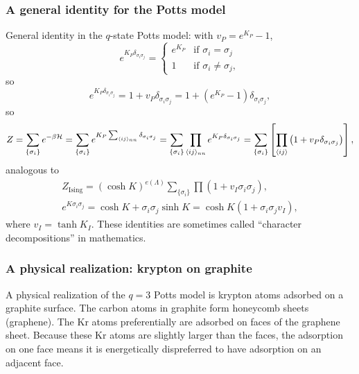 \subsubsection*{A general identity for the Potts model}

General identity in the $q$-state Potts model: with $v_P = e^{K_P}-1$,
\begin{equation}
  e^{K_P\delta_{\sigma_i\sigma_j}} = \begin{cases} e^{K_P} & \text{if } \sigma_i = \sigma_j\\ 1 & \text{if } \sigma_i\ne\sigma_j,\end{cases}
\end{equation}
so
\begin{equation}
  e^{K_P\delta_{\sigma_i\sigma_j}} = 1 + v_P\delta_{\sigma_i\sigma_j} = 1 + \left(e^{K_P}-1\right)\delta_{\sigma_i\sigma_j},
\end{equation}
so
\begin{equation}
  Z = \sum_{\{\sigma_i\}}e^{-\beta\mathcal{H}} = \sum_{\{\sigma_i\}}e^{K_P\sum_{\langle ij\rangle_{nn}}\delta_{\sigma_i\sigma_j}}
    = \sum_{\{\sigma_i\}}\prod_{\langle ij\rangle_{nn}}e^{K_P\delta_{\sigma_i\sigma_j}}
    = \sum_{\{\sigma_i\}}\left[\prod_{\langle ij\rangle}\left(1+v_P\delta_{\sigma_i\sigma_j}\right)\right],
\end{equation}
analogous to
\begin{gather}
  Z_{\text{Ising}} = (\cosh K)^{e(\Lambda)}\sum_{\{\sigma_i\}}\prod\left(1+v_I\sigma_i\sigma_j\right),\nonumber\\
  e^{K\sigma_i\sigma_j} = \cosh K + \sigma_i\sigma_j\sinh K = \cosh K\left(1+\sigma_i\sigma_jv_I\right),
\end{gather}
where $v_I = \tanh K_I$. These identities are sometimes called ``character decompositions'' in mathematics.

\subsubsection*{A physical realization: krypton on graphite}

A physical realization of the $q = 3$ Potts model is krypton atoms adsorbed on a graphite surface. The carbon atoms in
graphite form honeycomb sheets (graphene). The Kr atoms preferentially are adsorbed on faces of the graphene sheet. Because
these Kr atoms are slightly larger than the faces, the adsorption on one face means it is energetically dispreferred to have
adsorption on an adjacent face.

